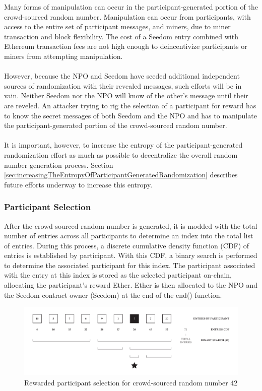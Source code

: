 \documentclass[11pt]{article}
\begin{document}
Many forms of manipulation can occur in the participant-generated portion of the crowd-sourced random number. Manipulation can occur from participants, with access to the entire set of participant messages, and miners, due to miner transaction and block flexibility. The cost of a Seedom entry combined with Ethereum transaction fees are not high enough to deincentivize participants or miners from attempting manipulation.\\\\
However, because the NPO and Seedom have seeded additional independent sources of randomization with their revealed messages, such efforts will be in vain. Neither Seedom nor the NPO will know of the other's message until their are reveled. An attacker trying to rig the selection of a participant for reward has to know the secret messages of both Seedom and the NPO and has to manipulate the participant-generated portion of the crowd-sourced random number.\\\\
It is important, however, to increase the entropy of the participant-generated randomization effort as much as possible to decentralize the overall random number generation process. Section \ref{sec:increasingTheEntropyOfParticipantGeneratedRandomization} describes future efforts underway to increase this entropy.

\subsubsection{Participant Selection}

After the crowd-sourced random number is generated, it is modded with the total number of entries across all participants to determine an index into the total list of entries. During this process, a discrete cumulative density function (CDF) of entries is established by participant. With this CDF, a binary search is performed to determine the associated participant for this index. The participant associated with the entry at this index is stored as the selected participant on-chain, allocating the participant's reward Ether. Ether is then allocated to the NPO and the Seedom contract owner (Seedom) at the end of the end() function.

\begin{figure}[H]
\begin{center}
\includegraphics[width=1.0\textwidth]{./graphics/rewarded-participant-selection.pdf}
\caption{Rewarded participant selection for crowd-sourced random number 42}
\label{figure:participantSelection}
\end{center}
\end{figure}
\end{document}
